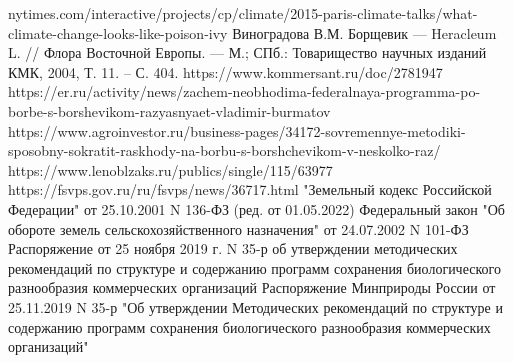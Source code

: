 \begin{thebibliography}{99}
	
	
	nytimes.com/interactive/projects/cp/climate/2015-paris-climate-talks/what-climate-change-looks-like-poison-ivy
	 Виноградова В.М. Борщевик — Heracleum L. // Флора Восточной Европы. — М.; СПб.: Товарищество научных изданий КМК, 2004, Т. 11. – С. 404.
	 https://www.kommersant.ru/doc/2781947
	 https://er.ru/activity/news/zachem-neobhodima-federalnaya-programma-po-borbe-s-borshevikom-razyasnyaet-vladimir-burmatov
	 https://www.agroinvestor.ru/business-pages/34172-sovremennye-metodiki-sposobny-sokratit-raskhody-na-borbu-s-borshchevikom-v-neskolko-raz/
	 https://www.lenoblzaks.ru/publics/single/115/63977
	 https://fsvps.gov.ru/ru/fsvps/news/36717.html
	 "Земельный кодекс Российской Федерации" от 25.10.2001 N 136-ФЗ (ред. от 01.05.2022)
	Федеральный закон "Об обороте земель сельскохозяйственного назначения" от 24.07.2002 N 101-ФЗ
	 Распоряжение от 25 ноября 2019 г. N 35-р об утверждении методических рекомендаций по структуре и содержанию программ сохранения биологического разнообразия коммерческих организаций	
	 Распоряжение Минприроды России от 25.11.2019 N 35-р "Об утверждении Методических рекомендаций по структуре и содержанию программ сохранения биологического разнообразия коммерческих организаций"
\end{thebibliography}
